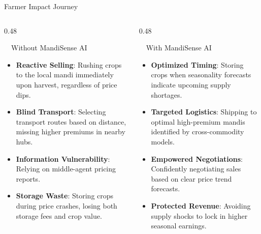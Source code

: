 \documentclass{beamer}
\begin{document}
\begin{frame}{Farmer Impact Journey}
\vspace{-0.2cm}

\begin{columns}[T]
    \begin{column}{0.48\textwidth}
        \begin{alertcard}[height=5.2cm]{~~Without MandiSense AI}
            \fontsize{6.8pt}{8.5pt}\selectfont
            \begin{itemize}\setlength\itemsep{4.5pt}\setlength\parskip{0pt}
                \item \textbf{Reactive Selling}: Rushing crops to the local mandi immediately upon harvest, regardless of price dips.
                \item \textbf{Blind Transport}: Selecting transport routes based on distance, missing higher premiums in nearby hubs.
                \item \textbf{Information Vulnerability}: Relying on middle-agent pricing reports.
                \item \textbf{Storage Waste}: Storing crops during price crashes, losing both storage fees and crop value.
            \end{itemize}
        \end{alertcard}
    \end{column}
    
    \begin{column}{0.48\textwidth}
        \begin{successcard}[height=5.2cm]{~~With MandiSense AI}
            \fontsize{6.8pt}{8.5pt}\selectfont
            \begin{itemize}\setlength\itemsep{4.5pt}\setlength\parskip{0pt}
                \item \textbf{Optimized Timing}: Storing crops when seasonality forecasts indicate upcoming supply shortages.
                \item \textbf{Targeted Logistics}: Shipping to optimal high-premium mandis identified by cross-commodity models.
                \item \textbf{Empowered Negotiations}: Confidently negotiating sales based on clear price trend forecasts.
                \item \textbf{Protected Revenue}: Avoiding supply shocks to lock in higher seasonal earnings.
            \end{itemize}
        \end{successcard}
    \end{column}
\end{columns}


\end{frame}
\end{document}

